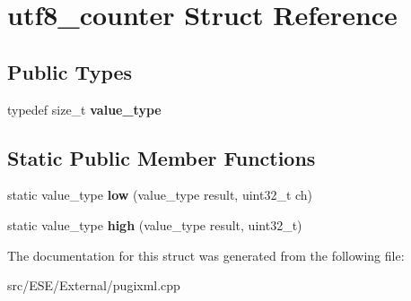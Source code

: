 \hypertarget{structutf8__counter}{\section{utf8\-\_\-counter Struct Reference}
\label{structutf8__counter}
}
\subsection*{Public Types}
\begin{DoxyCompactItemize}
\item 
\hypertarget{structutf8__counter_adb65152c007965c42184614da9c4af1b}{typedef size\-\_\-t {\bfseries value\-\_\-type}}\label{structutf8__counter_adb65152c007965c42184614da9c4af1b}

\end{DoxyCompactItemize}
\subsection*{Static Public Member Functions}
\begin{DoxyCompactItemize}
\item 
\hypertarget{structutf8__counter_a0950643189089175ae0eac9b4193534d}{static value\-\_\-type {\bfseries low} (value\-\_\-type result, uint32\-\_\-t ch)}\label{structutf8__counter_a0950643189089175ae0eac9b4193534d}

\item 
\hypertarget{structutf8__counter_ab16e675980a15e1ede2e4cd18d19f7b1}{static value\-\_\-type {\bfseries high} (value\-\_\-type result, uint32\-\_\-t)}\label{structutf8__counter_ab16e675980a15e1ede2e4cd18d19f7b1}

\end{DoxyCompactItemize}


The documentation for this struct was generated from the following file\-:\begin{DoxyCompactItemize}
\item 
src/\-E\-S\-E/\-External/pugixml.\-cpp\end{DoxyCompactItemize}

